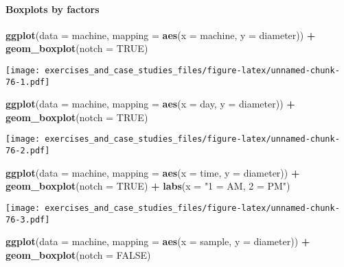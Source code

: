 \documentclass[]{book}
\newenvironment{Shaded}{\begin{snugshade}}{\end{snugshade}}
\newcommand{\DataTypeTok}[1]{\textcolor[rgb]{0.13,0.29,0.53}{#1}}
\newcommand{\KeywordTok}[1]{\textcolor[rgb]{0.13,0.29,0.53}{\textbf{#1}}}
\newcommand{\NormalTok}[1]{#1}
\newcommand{\OperatorTok}[1]{\textcolor[rgb]{0.81,0.36,0.00}{\textbf{#1}}}
\newcommand{\OtherTok}[1]{\textcolor[rgb]{0.56,0.35,0.01}{#1}}
\newcommand{\StringTok}[1]{\textcolor[rgb]{0.31,0.60,0.02}{#1}}
\let\oldparagraph\paragraph
\renewcommand{\paragraph}[1]{\oldparagraph{#1}\mbox{}}
\theoremstyle{definition}
\theoremstyle{definition}
\theoremstyle{definition}
\theoremstyle{remark}
\begin{document}
\hypertarget{boxplots-by-factors}{%
\paragraph{Boxplots by factors}\label{boxplots-by-factors}}

\begin{Shaded}
\begin{Highlighting}[]
\KeywordTok{ggplot}\NormalTok{(}\DataTypeTok{data =}\NormalTok{ machine, }\DataTypeTok{mapping =} \KeywordTok{aes}\NormalTok{(}\DataTypeTok{x =}\NormalTok{ machine, }\DataTypeTok{y =}\NormalTok{ diameter)) }\OperatorTok{+}
\StringTok{  }\KeywordTok{geom_boxplot}\NormalTok{(}\DataTypeTok{notch =} \OtherTok{TRUE}\NormalTok{)}
\end{Highlighting}
\end{Shaded}

\texttt{[image: exercises\_and\_case\_studies\_files/figure-latex/unnamed-chunk-76-1.pdf]}

\begin{Shaded}
\begin{Highlighting}[]
\KeywordTok{ggplot}\NormalTok{(}\DataTypeTok{data =}\NormalTok{ machine, }\DataTypeTok{mapping =} \KeywordTok{aes}\NormalTok{(}\DataTypeTok{x =}\NormalTok{ day, }\DataTypeTok{y =}\NormalTok{ diameter)) }\OperatorTok{+}
\StringTok{  }\KeywordTok{geom_boxplot}\NormalTok{(}\DataTypeTok{notch =} \OtherTok{TRUE}\NormalTok{)}
\end{Highlighting}
\end{Shaded}

\texttt{[image: exercises\_and\_case\_studies\_files/figure-latex/unnamed-chunk-76-2.pdf]}

\begin{Shaded}
\begin{Highlighting}[]
\KeywordTok{ggplot}\NormalTok{(}\DataTypeTok{data =}\NormalTok{ machine, }\DataTypeTok{mapping =} \KeywordTok{aes}\NormalTok{(}\DataTypeTok{x =}\NormalTok{ time, }\DataTypeTok{y =}\NormalTok{ diameter)) }\OperatorTok{+}
\StringTok{  }\KeywordTok{geom_boxplot}\NormalTok{(}\DataTypeTok{notch =} \OtherTok{TRUE}\NormalTok{) }\OperatorTok{+}
\StringTok{  }\KeywordTok{labs}\NormalTok{(}\DataTypeTok{x =} \StringTok{"1 = AM, 2 = PM"}\NormalTok{)}
\end{Highlighting}
\end{Shaded}

\texttt{[image: exercises\_and\_case\_studies\_files/figure-latex/unnamed-chunk-76-3.pdf]}

\begin{Shaded}
\begin{Highlighting}[]
\KeywordTok{ggplot}\NormalTok{(}\DataTypeTok{data =}\NormalTok{ machine, }\DataTypeTok{mapping =} \KeywordTok{aes}\NormalTok{(}\DataTypeTok{x =}\NormalTok{ sample, }\DataTypeTok{y =}\NormalTok{ diameter)) }\OperatorTok{+}
\StringTok{  }\KeywordTok{geom_boxplot}\NormalTok{(}\DataTypeTok{notch =} \OtherTok{FALSE}\NormalTok{)}
\end{Highlighting}
\end{Shaded}
\end{document}
